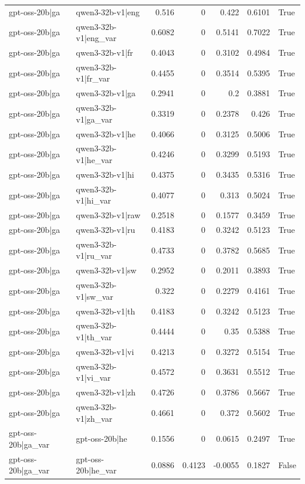 \begin{table}
\begin{tabular}{l l r r r r l}
gpt-oss-20b|ga & qwen3-32b-v1|eng & 0.516 & 0 & 0.422 & 0.6101 & True \\
gpt-oss-20b|ga & qwen3-32b-v1|eng_var & 0.6082 & 0 & 0.5141 & 0.7022 & True \\
gpt-oss-20b|ga & qwen3-32b-v1|fr & 0.4043 & 0 & 0.3102 & 0.4984 & True \\
gpt-oss-20b|ga & qwen3-32b-v1|fr_var & 0.4455 & 0 & 0.3514 & 0.5395 & True \\
gpt-oss-20b|ga & qwen3-32b-v1|ga & 0.2941 & 0 & 0.2 & 0.3881 & True \\
gpt-oss-20b|ga & qwen3-32b-v1|ga_var & 0.3319 & 0 & 0.2378 & 0.426 & True \\
gpt-oss-20b|ga & qwen3-32b-v1|he & 0.4066 & 0 & 0.3125 & 0.5006 & True \\
gpt-oss-20b|ga & qwen3-32b-v1|he_var & 0.4246 & 0 & 0.3299 & 0.5193 & True \\
gpt-oss-20b|ga & qwen3-32b-v1|hi & 0.4375 & 0 & 0.3435 & 0.5316 & True \\
gpt-oss-20b|ga & qwen3-32b-v1|hi_var & 0.4077 & 0 & 0.313 & 0.5024 & True \\
gpt-oss-20b|ga & qwen3-32b-v1|raw & 0.2518 & 0 & 0.1577 & 0.3459 & True \\
gpt-oss-20b|ga & qwen3-32b-v1|ru & 0.4183 & 0 & 0.3242 & 0.5123 & True \\
gpt-oss-20b|ga & qwen3-32b-v1|ru_var & 0.4733 & 0 & 0.3782 & 0.5685 & True \\
gpt-oss-20b|ga & qwen3-32b-v1|sw & 0.2952 & 0 & 0.2011 & 0.3893 & True \\
gpt-oss-20b|ga & qwen3-32b-v1|sw_var & 0.322 & 0 & 0.2279 & 0.4161 & True \\
gpt-oss-20b|ga & qwen3-32b-v1|th & 0.4183 & 0 & 0.3242 & 0.5123 & True \\
gpt-oss-20b|ga & qwen3-32b-v1|th_var & 0.4444 & 0 & 0.35 & 0.5388 & True \\
gpt-oss-20b|ga & qwen3-32b-v1|vi & 0.4213 & 0 & 0.3272 & 0.5154 & True \\
gpt-oss-20b|ga & qwen3-32b-v1|vi_var & 0.4572 & 0 & 0.3631 & 0.5512 & True \\
gpt-oss-20b|ga & qwen3-32b-v1|zh & 0.4726 & 0 & 0.3786 & 0.5667 & True \\
gpt-oss-20b|ga & qwen3-32b-v1|zh_var & 0.4661 & 0 & 0.372 & 0.5602 & True \\
gpt-oss-20b|ga_var & gpt-oss-20b|he & 0.1556 & 0 & 0.0615 & 0.2497 & True \\
gpt-oss-20b|ga_var & gpt-oss-20b|he_var & 0.0886 & 0.4123 & -0.0055 & 0.1827 & False \\

\end{tabular}
\end{table}
